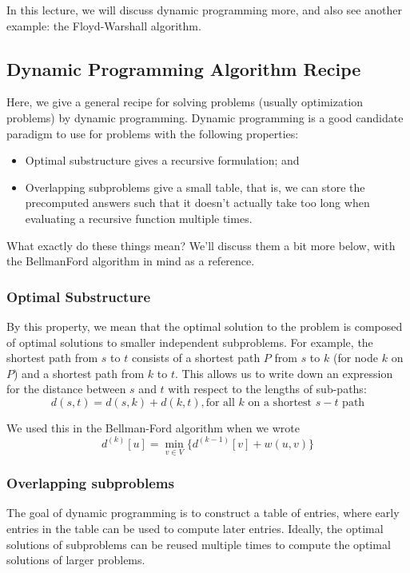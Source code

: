 \documentclass [12pt]{article}
\theoremstyle{definition}
\begin{document}
In this lecture, we will discuss dynamic programming more, and also see another example: the Floyd-Warshall algorithm.

\subsection{Dynamic Programming Algorithm Recipe}
Here, we give a general recipe for solving problems (usually optimization problems) by dynamic programming. Dynamic programming is a good candidate paradigm to use for problems with the following properties:

\begin{itemize}
  \item Optimal substructure gives a recursive formulation; and
  \item Overlapping subproblems give a small table, that is, we can store the precomputed
answers such that it doesn't actually take too long when evaluating a recursive function multiple times.
\end{itemize}

What exactly do these things mean? We'll discuss them a bit more below, with the BellmanFord algorithm in mind as a reference.

\subsubsection{Optimal Substructure} 

By this property, we mean that the optimal solution to the problem is composed of optimal solutions to smaller independent subproblems. For example, the shortest path from $s$ to $t$ consists of a shortest path $P$ from $s$ to $k$ (for node $k$ on $P$) and a shortest path from $k$ to $t$. This allows us to write down an expression for the distance between $s$ and $t$ with respect to the lengths of sub-paths: 
$$
d(s, t) = d(s, k) + d(k, t), \text{for all } k \text{ on a shortest } s - t \text{ path}
$$

We used this in the Bellman-Ford algorithm when we wrote 
$$
d^{(k)} [u] = \min_{v\in V} \{d^{(k-1)}[v ] + w(u, v )\}
$$

\subsubsection{Overlapping subproblems}
 
The goal of dynamic programming is to construct a table of entries, where early entries in the table can be used to compute later entries. Ideally, the optimal solutions of subproblems can be reused multiple times to compute the optimal solutions of larger problems. 
\end{document}
